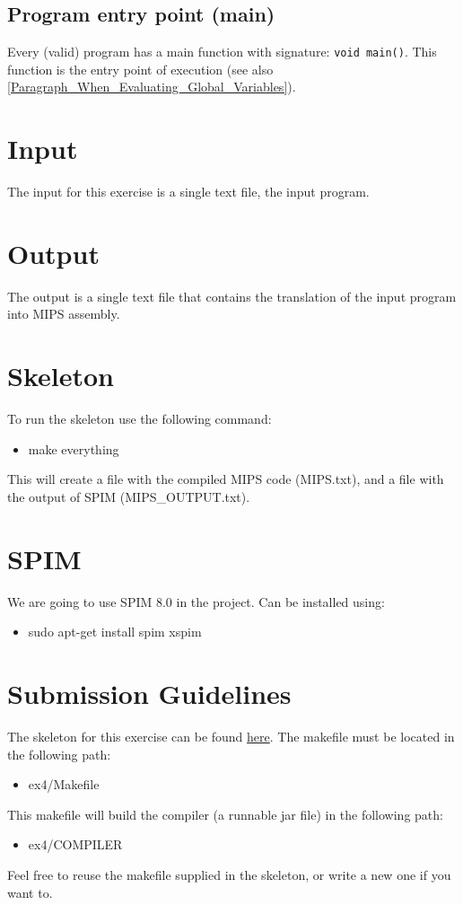 \documentclass{article}
\begin{document}
\subsection{Program entry point (main)}
\label{subsection_Program_Entry_Point_Main}
Every (valid) \plname program has a main function with signature: \verb"void main()".
This function is the entry point of execution (see also \ref{Paragraph_When_Evaluating_Global_Variables}).

\section{Input}
The input for this exercise is a single text file, the input \plname program.

\section{Output}
The output is a single text file that contains the
translation of the input program into MIPS assembly.

\section{Skeleton}
To run the skeleton use the following command:
\begin{itemize}
\item make everything
\end{itemize}
This will create a file with the compiled MIPS code (MIPS.txt), and a file with the output of SPIM (MIPS\_OUTPUT.txt).

\section{SPIM}
We are going to use SPIM 8.0 in the project.
Can be installed using:
\begin{itemize}
\item sudo apt-get install spim xspim
\end{itemize}

\section{Submission Guidelines}
The skeleton for this exercise can be found \href{https://github.com/davidtr1037/compilation-tau/tree/master/src/ex4}{here}.
The makefile must be located in the following path:
\begin{itemize}
    \item ex4/Makefile
\end{itemize}
This makefile will build the compiler (a runnable jar file) in the following path:
\begin{itemize}
    \item ex4/COMPILER
\end{itemize}
Feel free to reuse the makefile supplied in the skeleton,
or write a new one if you want to.
\end{document}
